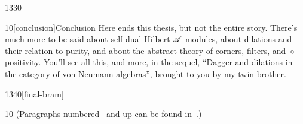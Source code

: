 \documentclass[b5paper]{book}
\begin{document}
%



\begin{parsec}{1330}
\begin{point}{10}[conclusion]{Conclusion}
Here ends this thesis,
but not the entire story.
There's much more to be said
about self-dual Hilbert $\mathscr{A}$-modules,
about dilations and their relation to purity,
and about the abstract theory of corners, filters,
and $\diamond$-positivity.
You'll see all this,
and more,
in the sequel,
``Dagger and dilations in the category of von Neumann algebras''\cite{bas},
brought to you by my twin brother.
\end{point}
\end{parsec}
\begin{parsec}{1340}[final-bram]
\begin{point}{10}
(Paragraphs numbered~
and up can be found in~\cite{bas}.)
\end{point}
\end{parsec}

\backmatter

\fancyfoot[CE]{}
\fancyfoot[CO]{}

\printindex

\begingroup
\renewcommand\chapter[2]{\backmattertitle{Bibliography}}
{}
\endgroup


\end{document}
